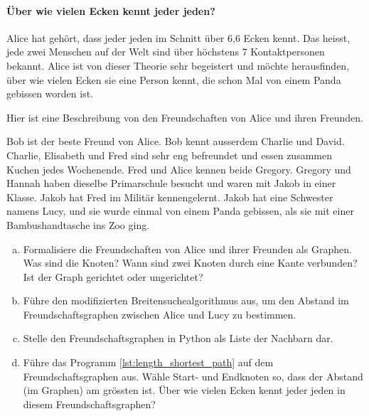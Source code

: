 \paragraph{Über wie vielen Ecken kennt jeder jeden?}
Alice hat gehört, dass jeder jeden im Schnitt über 6,6 Ecken kennt. Das heisst, jede zwei Menschen auf der Welt sind über höchstens 7 Kontaktpersonen bekannt. Alice ist von dieser Theorie sehr begeistert und möchte herausfinden, über wie vielen Ecken sie eine Person kennt, die schon Mal von einem Panda gebissen worden ist.

\begin{aufgabe}\label{aufgabe_panda_gebissen}
Hier ist eine Beschreibung von den Freundschaften von Alice und ihren Freunden.
\begin{displayquote}
Bob ist der beste Freund von Alice. Bob kennt ausserdem Charlie und David. Charlie, Elisabeth und Fred sind sehr eng befreundet und essen zusammen Kuchen jedes Wochenende. Fred und Alice kennen beide Gregory. Gregory und Hannah haben dieselbe Primarschule besucht und waren mit Jakob in einer Klasse. Jakob hat Fred im Militär kennengelernt. Jakob hat eine Schwester namens Lucy, und sie wurde einmal von einem Panda gebissen, als sie mit einer Bambushandtasche ins Zoo ging.
\end{displayquote}

\begin{enumerate}[(a)]
    \item Formalisiere die Freundschaften von Alice und ihrer Freunden als Graphen. Was sind die Knoten? Wann sind zwei Knoten durch eine Kante verbunden? Ist der Graph gerichtet oder ungerichtet?
    \item Führe den modifizierten Breitensuchealgorithmus aus, um den Abstand im Freundschaftsgraphen zwischen Alice und Lucy zu bestimmen.
    \item Stelle den Freundschaftsgraphen in Python als Liste der Nachbarn dar.
    \item Führe das Programm \ref{lst:length_shortest_path} auf dem Freundschaftsgraphen aus. Wähle Start- und Endknoten so, dass der Abstand (im Graphen) am grössten ist. Über wie vielen Ecken kennt jeder jeden in diesem Freundschaftsgraphen? 
\end{enumerate}

\end{aufgabe}



